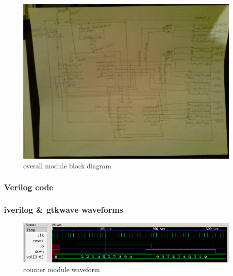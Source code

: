 \documentclass{article}
\begin{document}
      \begin{figure}[H]
        \centering
        \includegraphics[width=0.75\linewidth]{figures/block_diagrams/overall.jpg}
        \caption{overall module block diagram}
        \label{fig:overall_blockdiagram}
      \end{figure}

    \subsubsection{Verilog code}
      
      

      
      

      
      

      
      

      
      

    \subsubsection{iverilog \& gtkwave waveforms}
      \begin{figure}[H]
        \centering
        \includegraphics[width=0.75\linewidth]{figures/gtkwave/counter_gtkwave.png}
        \caption{counter module waveform}
        \label{fig:counter_gtkwave}
      \end{figure}
\end{document}
